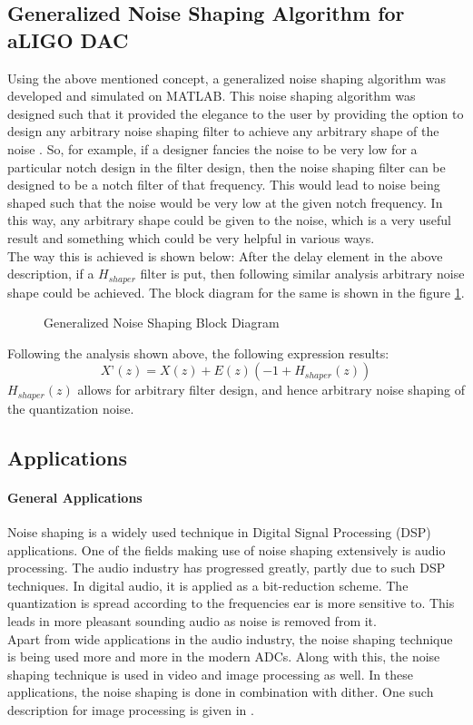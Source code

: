 \documentclass[a4paper,12pt]{article}
\begin{document}
	\subsection{Generalized Noise Shaping Algorithm for aLIGO DAC}
	Using the above mentioned concept, a generalized noise shaping algorithm was developed and simulated on MATLAB. This noise shaping algorithm was designed such that it provided the elegance to the user by providing the option to design any arbitrary noise shaping filter to achieve any arbitrary shape of the noise \cite{Nentwig}. So, for example, if a designer fancies the noise to be very low for a particular notch design in the filter design, then the noise shaping filter can be designed to be a notch filter of that frequency. This would lead to noise being shaped such that the noise would be very low at the given notch frequency. In this way, any arbitrary shape could be given to the noise, which is a very useful result and something which could be very helpful in various ways. \\The way this is achieved is shown below:
	After the delay element in the above description, if a $H_{shaper}$ filter is put, then following similar analysis arbitrary noise shape could be achieved. The block diagram for the same is shown in the figure \ref{shaper}.
	\begin{figure}[H]

  		\centering
		\def\svgscale{0.5}
  		\tiny{
  		
  		}
  		\caption{Generalized Noise Shaping Block Diagram}
		\label{shaper}
	\end{figure}
	Following the analysis shown above, the following expression results: \\
	\begin{equation}
	X’(z) = X(z) + E(z) (-1 + H_{shaper}(z))
	\end{equation}
	$H_{shaper}(z)$ allows for arbitrary filter design, and hence arbitrary noise shaping of the quantization noise.
    \subsection{Applications}
    		\paragraph{General Applications} Noise shaping is a widely used technique in Digital Signal Processing (DSP) applications. One of the fields making use of noise shaping extensively is audio processing. The audio industry has progressed greatly, partly due to such DSP techniques. In digital audio, it is applied as a bit-reduction scheme. The quantization is spread according to the frequencies ear is more sensitive to. This leads in more pleasant sounding audio as noise is removed from it. \\
    		Apart from wide applications in the audio industry, the noise shaping technique is being used more and more in the modern ADCs. Along with this, the noise shaping technique is used in video and image processing as well. In these applications, the noise shaping is done in combination with dither. One such description for image processing is given in \cite{Christou}. 
\end{document}
